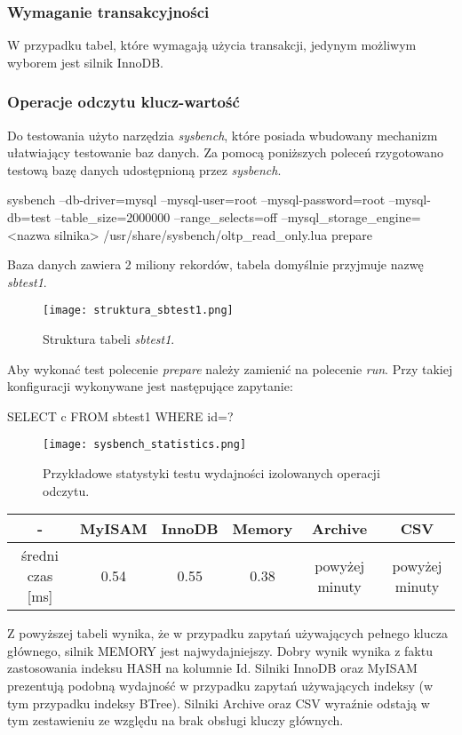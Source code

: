 \subsubsection{Wymaganie transakcyjności}
W przypadku tabel, które wymagają użycia transakcji, jedynym możliwym wyborem jest silnik InnoDB.

\subsubsection{Operacje odczytu klucz-wartość}
Do testowania użyto narzędzia \textit{sysbench}, które posiada wbudowany mechanizm ułatwiający testowanie baz danych. Za pomocą poniższych poleceń rzygotowano testową bazę danych udostępnioną przez \textit{sysbench}. 
\begin{spverbatim}
	sysbench --db-driver=mysql --mysql-user=root --mysql-password=root 
	--mysql-db=test --table_size=2000000 --range_selects=off 
	--mysql_storage_engine=	<nazwa silnika> 
	/usr/share/sysbench/oltp_read_only.lua prepare
\end{spverbatim} 
Baza danych zawiera 2 miliony rekordów, tabela domyślnie przyjmuje nazwę \textit{sbtest1}.
\begin{figure}[H]
	\centering
	\texttt{[image: struktura\_sbtest1.png]}
	\caption{Struktura tabeli \textit{sbtest1}.}
	\label{fig:label}
\end{figure}

Aby wykonać test polecenie \textit{prepare} należy zamienić na polecenie \textit{run}. Przy takiej konfiguracji wykonywane jest następujące zapytanie:
\begin{spverbatim}
	SELECT c FROM sbtest1 WHERE id=?
\end{spverbatim}
\begin{figure}[H]
	\centering
	\texttt{[image: sysbench\_statistics.png]}
	\caption{Przykładowe statystyki testu wydajności izolowanych operacji odczytu.}
	\label{fig:label}
\end{figure}
\begin{center}
	\begin{tabular}{ | c | c | c | c | c | c |}
		\hline
		- & MyISAM & InnoDB & Memory & Archive & CSV  \\ 
		\hline
		średni czas [ms] & 0.54 & 0.55 & 0.38 & powyżej minuty & powyżej minuty \\
		\hline
	\end{tabular}
\end{center}
Z powyższej tabeli wynika, że w przypadku zapytań używających pełnego klucza głównego, silnik MEMORY jest najwydajniejszy. Dobry wynik wynika z faktu zastosowania indeksu HASH na kolumnie Id. Silniki InnoDB oraz MyISAM prezentują podobną wydajność w przypadku zapytań używających indeksy (w tym przypadku indeksy BTree). Silniki Archive oraz CSV wyraźnie odstają w tym zestawieniu ze względu na brak obsługi kluczy głównych.


